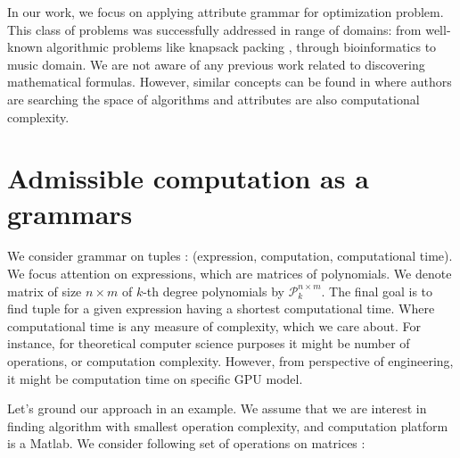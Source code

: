 \documentclass{article}
\begin{document}
In our work, we focus on applying attribute grammar for optimization problem. This class
of problems was successfully addressed in range of domains: from well-known algorithmic problems 
like knapsack packing \cite{o2004solving}, through bioinformatics \cite{waldispuhl2002approximate} to music domain\cite{desainte1994using}.
We are not aware of any previous work related to discovering mathematical formulas. However,
similar concepts can be found in \cite{cheung1999attribute} where authors are searching
the space of algorithms and attributes are also computational complexity.




\section{Admissible computation as a grammars}\label{sec:grammars}

We consider grammar on tuples : (expression, computation, computational time).
We focus attention on expressions, which are matrices of polynomials. We denote
matrix of size $n \times m$ of $k$-th degree polynomials by $\mathcal{P}^{n
\times m}_k$.  The final goal is to find tuple for a given expression having
a shortest computational time. Where computational time is any measure of
complexity, which we care about. For instance, for theoretical computer science
purposes it might be number of operations, or computation complexity. However,
from perspective of engineering, it might be computation time on specific GPU
model. 


Let's ground our approach in an example. We assume that we are interest in
finding algorithm with smallest operation complexity, and computation platform
is a Matlab.  We consider following set of operations on matrices : 
\end{document}
